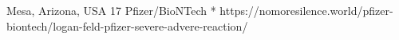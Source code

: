          {Mesa, Arizona, USA}
          {17}
          {Pfizer/BioNTech}
          {*}
          {
          }
          {https://nomoresilence.world/pfizer-biontech/logan-feld-pfizer-severe-advere-reaction/}
